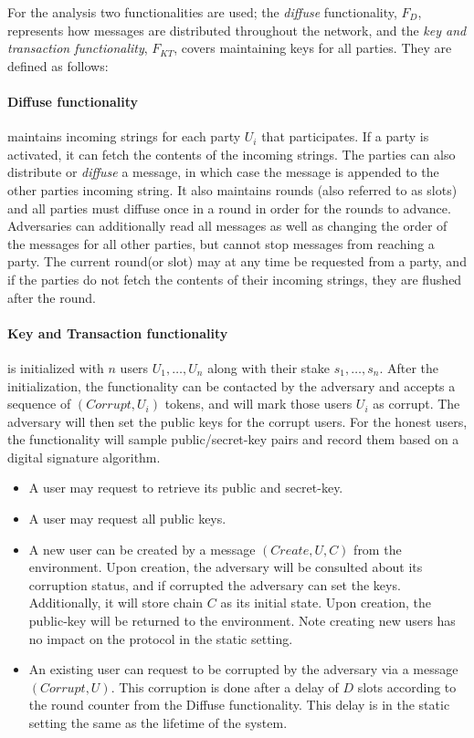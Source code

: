 For the analysis two functionalities are used; the \emph{diffuse} functionality, $F_D$, represents how messages are distributed throughout the network, and the \emph{key and transaction functionality}, $F_{KT}$, covers maintaining keys for all parties. They are defined as follows:

\paragraph{Diffuse functionality} maintains incoming strings for each party $U_i$ that participates. If a party is activated, it can fetch the contents of the incoming strings. The parties can also distribute or \emph{diffuse} a message, in which case the message is appended to the other parties incoming string. It also maintains rounds (also referred to as slots) and all parties must diffuse once in a round in order for the rounds to advance. Adversaries can additionally read all messages as well as changing the order of the messages for all other parties, but cannot stop messages from reaching a party. The current round(or slot) may at any time be requested from a party, and if the parties do not fetch the contents of their incoming strings, they are flushed after the round. 

\paragraph{Key and Transaction functionality} is initialized with $n$ users $U_1, \dots, U_n$ along with their stake $s_1,\dots, s_n$. After the initialization, the functionality can be contacted by the adversary and accepts a sequence of $(Corrupt, U_i)$ tokens, and will mark those users $U_i$ as corrupt. The adversary will then set the public keys for the corrupt users. For the honest users, the functionality will sample public/secret-key pairs and record them based on a digital signature algorithm.
\begin{itemize}
    \item A user may request to retrieve its public and secret-key.
    \item A user may request all public keys.
    \item A new user can be created by a message $(Create, U, C)$ from the environment. Upon creation, the adversary will be consulted about its corruption status, and if corrupted the adversary can set the keys. Additionally, it will store chain $C$ as its initial state. Upon creation, the public-key will be returned to the environment. Note creating new users has no impact on the protocol in the static setting.
    \item An existing user can request to be corrupted by the adversary via a message $(Corrupt, U)$. This corruption is done after a delay of $D$ slots according to the round counter from the Diffuse functionality. This delay is in the static setting the same as the lifetime of the system.
\end{itemize}

